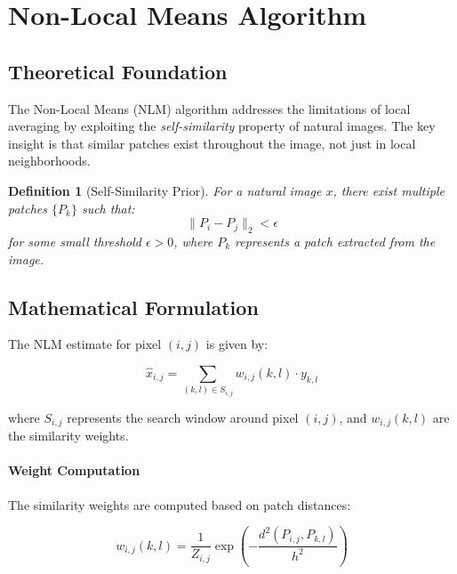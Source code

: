 \documentclass[12pt]{article}
\newtheorem{definition}[theorem]{Definition}
\begin{document}
\newpage

\section{Non-Local Means Algorithm}
\label{sec:nlm}

\subsection{Theoretical Foundation}
\label{subsec:nlm_theory}

The Non-Local Means (NLM) algorithm addresses the limitations of local averaging by exploiting the \textit{self-similarity} property of natural images. The key insight is that similar patches exist throughout the image, not just in local neighborhoods.

\begin{definition}[Self-Similarity Prior]
    \label{def:self_similarity}
    For a natural image $x$, there exist multiple patches $\{P_k\}$ such that:
    \begin{equation}
        \|P_i - P_j\|_2 < \epsilon
    \end{equation}
    for some small threshold $\epsilon > 0$, where $P_k$ represents a patch extracted from the image.
\end{definition}

\subsection{Mathematical Formulation}
\label{subsec:nlm_formulation}

The NLM estimate for pixel $(i,j)$ is given by:

\begin{equation}
    \label{eq:nlm_estimate}
    \hat{x}_{i,j} = \sum_{(k,l) \in S_{i,j}} w_{i,j}(k,l) \cdot y_{k,l}
\end{equation}

where $S_{i,j}$ represents the search window around pixel $(i,j)$, and $w_{i,j}(k,l)$ are the similarity weights.

\paragraph{Weight Computation}
The similarity weights are computed based on patch distances:

\begin{equation}
    \label{eq:nlm_weights}
    w_{i,j}(k,l) = \frac{1}{Z_{i,j}} \exp\left(-\frac{d^2(P_{i,j}, P_{k,l})}{h^2}\right)
\end{equation}
\end{document}
